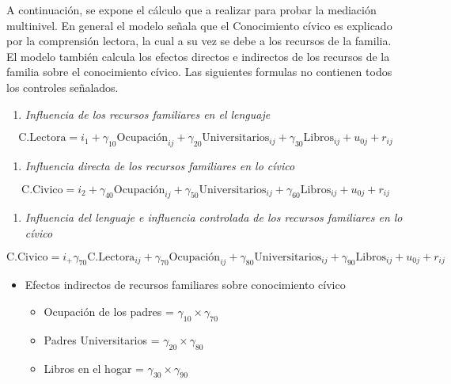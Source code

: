 \documentclass[12pt,twoside]{templates/facsothesis}
\providecommand{\tightlist}{%
  \setlength{\itemsep}{0pt}\setlength{\parskip}{0pt}}
\begin{document}
A continuación, se expone el cálculo que a realizar para probar la mediación multinivel. En general el modelo señala que el Conocimiento cívico es explicado por la comprensión lectora, la cual a su vez se debe a los recursos de la familia. El modelo también calcula los efectos directos e indirectos de los recursos de la familia sobre el conocimiento cívico. Las siguientes formulas no contienen todos los controles señalados.

\begin{enumerate}
\def\labelenumi{\alph{enumi})}
\tightlist
\item
  \emph{Influencia de los recursos familiares en el lenguaje}
\end{enumerate}

\begin{equation}
\text{C.Lectora}= i_1 +\gamma_{10}\text{Ocupación}_{ij} + \gamma_{20}\text{Universitarios}_{ij}+ \gamma_{30}\text{Libros}_{ij}+u_{0j}+r_{ij}
\end{equation}

\begin{enumerate}
\def\labelenumi{\alph{enumi})}
\setcounter{enumi}{1}
\tightlist
\item
  \emph{Influencia directa de los recursos familiares en lo cívico}
\end{enumerate}

\begin{equation}
\text{C.Civico}= i_2+\gamma_{40}\text{Ocupación}_{ij} + \gamma_{50}\text{Universitarios}_{ij}+ \gamma_{60}\text{Libros}_{ij}+u_{0j}+r_{ij}
\end{equation}

\begin{enumerate}
\def\labelenumi{\alph{enumi})}
\setcounter{enumi}{2}
\tightlist
\item
  \emph{Influencia del lenguaje e influencia controlada de los recursos familiares en lo cívico}
\end{enumerate}

\begin{equation}
\text{C.Civico}= i_+\gamma_{70}\text{C.Lectora}_{ij}+\gamma_{70}\text{Ocupación}_{ij} + \gamma_{80}\text{Universitarios}_{ij}+ \gamma_{90}\text{Libros}_{ij}+u_{0j}+r_{ij}
\end{equation}

\begin{itemize}
\item
  Efectos indirectos de recursos familiares sobre conocimiento cívico

  \begin{itemize}
  \item
    Ocupación de los padres = \(\gamma_{10}\times\gamma_{70}\)
  \item
    Padres Universitarios = \(\gamma_{20}\times\gamma_{80}\)
  \item
    Libros en el hogar = \(\gamma_{30}\times\gamma_{90}\)
  \end{itemize}
\end{itemize}
\end{document}
